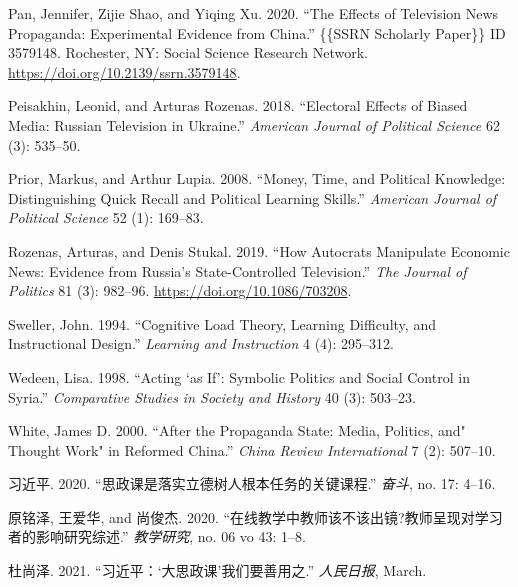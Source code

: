 \documentclass[
  12pt,
]{ctexart}
\newlength{\cslhangindent}
\newlength{\cslentryspacingunit} %
\newenvironment{CSLReferences}[2] %
 {%
  \setlength{\parindent}{0pt}
  \ifodd #1
  \let\oldpar\par
  \def\par{\hangindent=\cslhangindent\oldpar}
  \fi
  \setlength{\parskip}{#2\cslentryspacingunit}
 }%
 {}
\begin{document}
\begin{CSLReferences}{1}{0}
\leavevmode{}%
Pan, Jennifer, Zijie Shao, and Yiqing Xu. 2020. {``The {Effects} of {Television News Propaganda}: {Experimental Evidence} from {China}.''} \{\{SSRN Scholarly Paper\}\} ID 3579148. {Rochester, NY}: {Social Science Research Network}. \url{https://doi.org/10.2139/ssrn.3579148}.

\leavevmode{}%
Peisakhin, Leonid, and Arturas Rozenas. 2018. {``Electoral Effects of Biased Media: {Russian} Television in {Ukraine}.''} \emph{American Journal of Political Science} 62 (3): 535--50.

\leavevmode{}%
Prior, Markus, and Arthur Lupia. 2008. {``Money, Time, and Political Knowledge: {Distinguishing} Quick Recall and Political Learning Skills.''} \emph{American Journal of Political Science} 52 (1): 169--83.

\leavevmode{}%
Rozenas, Arturas, and Denis Stukal. 2019. {``How {Autocrats Manipulate Economic News}: {Evidence} from {Russia}'s {State}-{Controlled Television}.''} \emph{The Journal of Politics} 81 (3): 982--96. \url{https://doi.org/10.1086/703208}.

\leavevmode{}%
Sweller, John. 1994. {``Cognitive Load Theory, Learning Difficulty, and Instructional Design.''} \emph{Learning and Instruction} 4 (4): 295--312.

\leavevmode{}%
Wedeen, Lisa. 1998. {``Acting {`as If'}: Symbolic Politics and Social Control in {Syria}.''} \emph{Comparative Studies in Society and History} 40 (3): 503--23.

\leavevmode{}%
White, James D. 2000. {``After the {Propaganda State}: {Media}, {Politics}, and" {Thought Work}" in {Reformed China}.''} \emph{China Review International} 7 (2): 507--10.

\leavevmode{}%
习近平. 2020. {``{思政课是落实立德树人根本任务的关键课程}.''} \emph{奋斗}, no. 17: 4--16.

\leavevmode{}%
原铭泽, 王爱华, and 尚俊杰. 2020. {``{在线教学中教师该不该出镜?\textemdash\textemdash 教师呈现对学习者的影响研究综述}.''} \emph{教学研究}, no. 06 vo 43: 1--8.

\leavevmode{}%
杜尚泽. 2021. {``习近平：{`大思政课'}我们要善用之.''} \emph{人民日报}, March.


\end{CSLReferences}
\end{document}
